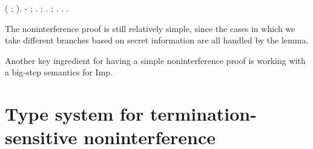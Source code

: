 \documentclass[12pt]{report}
\begin{document}
\begin{coqdoccode}
\coqdocindent{4.00em}
 ( ;  ).\coqdoceol
\coqdocindent{1.00em}
- \coqdoceol
\coqdocindent{2.00em}
 ;  .  ;  .\coqdoceol
\coqdocindent{2.00em}
 ;  .  .\coqdoceol
\coqdocnoindent
{}.\coqdoceol
\coqdocemptyline
\end{coqdoccode}
The noninterference proof is still relatively simple, since the
    cases in which we take different branches based on secret
    information are all handled by the  lemma.


    Another key ingredient for having a simple noninterference proof
    is working with a big-step semantics for Imp. 
\begin{coqdoccode}
\coqdocemptyline
\end{coqdoccode}
\section{Type system for termination-sensitive noninterference}
\end{document}
